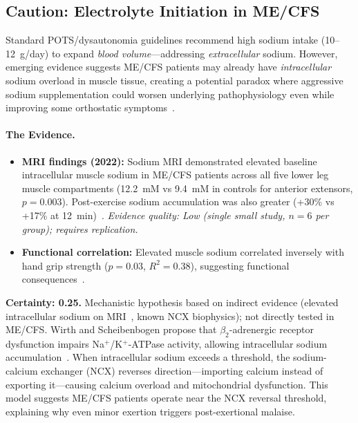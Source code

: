 \subsection{Caution: Electrolyte Initiation in ME/CFS}
\label{subsec:electrolyte-initiation-caution}

\begin{warning}
Standard POTS/dysautonomia guidelines recommend high sodium intake (10--12~g/day) to expand \textit{blood volume}---addressing \textit{extracellular} sodium. However, emerging evidence suggests ME/CFS patients may already have \textit{intracellular} sodium overload in muscle tissue, creating a potential paradox where aggressive sodium supplementation could worsen underlying pathophysiology even while improving some orthostatic symptoms~\cite{Wirth2021muscle,Petter2022sodium,Scheibenbogen2025muscle}.
\end{warning}

\paragraph{The Evidence.}
\begin{itemize}
    \item \textbf{MRI findings (2022):} Sodium MRI demonstrated elevated baseline intracellular muscle sodium in ME/CFS patients across all five lower leg muscle compartments (12.2~mM vs 9.4~mM in controls for anterior extensors, $p=0.003$). Post-exercise sodium accumulation was also greater (+30\% vs +17\% at 12~min)~\cite{Petter2022sodium}. \textit{Evidence quality: Low (single small study, $n=6$ per group); requires replication.}
    \item \textbf{Functional correlation:} Elevated muscle sodium correlated inversely with hand grip strength ($p=0.03$, $R^2=0.38$), suggesting functional consequences~\cite{Petter2022sodium}.
\end{itemize}

\begin{speculation}
\label{spec:ncx-reversal}
\textbf{Certainty: 0.25.} Mechanistic hypothesis based on indirect evidence (elevated intracellular sodium on MRI~\cite{Petter2022sodium}, known NCX biophysics); not directly tested in ME/CFS. Wirth and Scheibenbogen propose that $\beta_2$-adrenergic receptor dysfunction impairs Na$^+$/K$^+$-ATPase activity, allowing intracellular sodium accumulation~\cite{Wirth2021muscle,Scheibenbogen2025muscle}. When intracellular sodium exceeds a threshold, the sodium-calcium exchanger (NCX) reverses direction---importing calcium instead of exporting it---causing calcium overload and mitochondrial dysfunction. This model suggests ME/CFS patients operate near the NCX reversal threshold, explaining why even minor exertion triggers post-exertional malaise.
\end{speculation}

